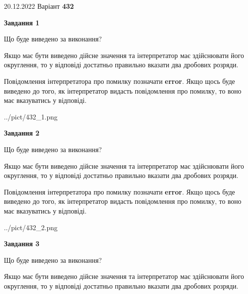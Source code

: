 \documentclass[12pt, ukrainian]{article}
\begin{document}
{20.12.2022 Варіант \No \textbf { 432 }\par}
{
\begin {Large}

{\begin {center}\textbf{Завдання 1}\end {center}}\par
Що буде виведено за виконання? \par

Якщо має бути виведено дійсне значення та інтерпретатор має здійснювати його округлення, 
то у відповіді достатньо правильно вказати два дробових розряди.

Повідомлення інтерпретатора про помилку позначати \textbf{error}.
Якщо щось буде виведено до того, як інтерпретатор видасть повідомлення про помилку, 
то воно має вказуватись у відповіді. \par

\begin{center}
	{../pict/432_1.png}
\end{center}
\newpage

{\begin {center}\textbf{Завдання 2}\end {center}}\par
Що буде виведено за виконання? \par

Якщо має бути виведено дійсне значення та інтерпретатор має здійснювати його округлення, 
то у відповіді достатньо правильно вказати два дробових розряди.

Повідомлення інтерпретатора про помилку позначати \textbf{error}.
Якщо щось буде виведено до того, як інтерпретатор видасть повідомлення про помилку, 
то воно має вказуватись у відповіді. \par

\begin{center}
	{../pict/432_2.png}
\end{center}
\newpage

{\begin {center}\textbf{Завдання 3}\end {center}}\par
Що буде виведено за виконання? \par

Якщо має бути виведено дійсне значення та інтерпретатор має здійснювати його округлення, 
то у відповіді достатньо правильно вказати два дробових розряди.


\end{Large}}
\end{document}
